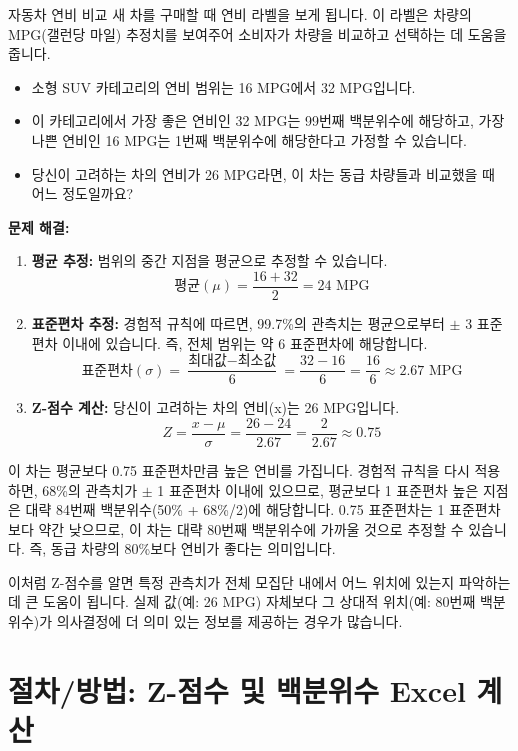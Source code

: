 \documentclass[11pt,a4paper]{article}
\begin{document}
\begin{examplebox}{자동차 연비 비교}
새 차를 구매할 때 연비 라벨을 보게 됩니다. 이 라벨은 차량의 MPG(갤런당 마일) 추정치를 보여주어 소비자가 차량을 비교하고 선택하는 데 도움을 줍니다.
\begin{itemize}
    \item 소형 SUV 카테고리의 연비 범위는 16 MPG에서 32 MPG입니다.
    \item 이 카테고리에서 가장 좋은 연비인 32 MPG는 99번째 백분위수에 해당하고, 가장 나쁜 연비인 16 MPG는 1번째 백분위수에 해당한다고 가정할 수 있습니다.
    \item 당신이 고려하는 차의 연비가 26 MPG라면, 이 차는 동급 차량들과 비교했을 때 어느 정도일까요?
\end{itemize}

\textbf{문제 해결:}
\begin{enumerate}
    \item \textbf{평균 추정:} 범위의 중간 지점을 평균으로 추정할 수 있습니다.
    \[ \text{평균} (\mu) = \frac{16 + 32}{2} = 24 \text{ MPG} \]
    \item \textbf{표준편차 추정:} 경험적 규칙에 따르면, 99.7\%의 관측치는 평균으로부터 \(\pm\) 3 표준편차 이내에 있습니다. 즉, 전체 범위는 약 6 표준편차에 해당합니다.
    \[ \text{표준편차} (\sigma) = \frac{\text{최대값} - \text{최소값}}{6} = \frac{32 - 16}{6} = \frac{16}{6} \approx 2.67 \text{ MPG} \]
    \item \textbf{Z-점수 계산:} 당신이 고려하는 차의 연비(x)는 26 MPG입니다.
    \[ Z = \frac{x - \mu}{\sigma} = \frac{26 - 24}{2.67} = \frac{2}{2.67} \approx 0.75 \]
\end{enumerate}
이 차는 평균보다 0.75 표준편차만큼 높은 연비를 가집니다. 경험적 규칙을 다시 적용하면, 68\%의 관측치가 \(\pm\) 1 표준편차 이내에 있으므로, 평균보다 1 표준편차 높은 지점은 대략 84번째 백분위수(50\% + 68\%/2)에 해당합니다. 0.75 표준편차는 1 표준편차보다 약간 낮으므로, 이 차는 대략 80번째 백분위수에 가까울 것으로 추정할 수 있습니다. 즉, 동급 차량의 80\%보다 연비가 좋다는 의미입니다.

이처럼 Z-점수를 알면 특정 관측치가 전체 모집단 내에서 어느 위치에 있는지 파악하는 데 큰 도움이 됩니다. 실제 값(예: 26 MPG) 자체보다 그 상대적 위치(예: 80번째 백분위수)가 의사결정에 더 의미 있는 정보를 제공하는 경우가 많습니다.
\end{examplebox}

\newpage
\section{절차/방법: Z-점수 및 백분위수 Excel 계산}
\end{document}
